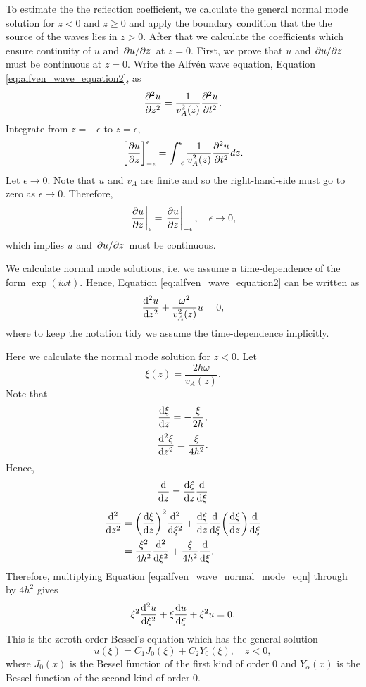 To estimate the the reflection coefficient, we calculate the general normal mode solution for $z<0$ and $z\ge0$ and apply the boundary condition that the the source of the waves lies in $z>0$. After that we calculate the coefficients which ensure continuity of $u$ and $\pdv*{u}{z}$ at $z=0$. First, we prove that $u$ and $\pdv*{u}{z}$ must be continuous at $z=0$. Write the Alfv\'en wave equation, Equation \eqref{eq:alfven_wave_equation2}, as
\[\pdv[2]{u}{z}=\frac{1}{v_A^2(z)}\pdv[2]{u}{t}.\]
Integrate from $z=-\epsilon$ to $z=\epsilon$,
\[\qty[\pdv{u}{z}]_{-\epsilon}^\epsilon=\int_{-\epsilon}^\epsilon\frac{1}{v_A^2(z)}\pdv[2]{u}{t}dz.\]
Let $\epsilon\rightarrow0$. Note that $u$ and $v_A$ are finite and so the right-hand-side must go to zero as $\epsilon\rightarrow 0$. Therefore,
\[\left.\pdv{u}{z}\right|_{\epsilon}=\left.\pdv{u}{z}\right|_{-\epsilon},\quad \epsilon\rightarrow0,\]
which implies $u$ and $\pdv*{u}{z}$ must be continuous.

We calculate normal mode solutions, i.e. we assume a time-dependence of the form $\exp(i\omega t)$. Hence, Equation \eqref{eq:alfven_wave_equation2} can be written as
\begin{equation}
    \label{eq:alfven_wave_normal_mode_eqn}
    \dv[2]{u}{z}+\frac{\omega^2}{v_A^2(z)}u=0,
\end{equation}
where to keep the notation tidy we assume the time-dependence implicitly.

Here we calculate the normal mode solution for $z<0$. Let 
\begin{equation}
    \xi(z)=\frac{2h\omega}{v_A(z)}.
\end{equation}
Note that
\[\dv{\xi}{z}=-\frac{\xi}{2h},\]
\[\dv[2]{\xi}{z}=\frac{\xi}{4h^2}.\]
Hence,
\[\dv{}{z}=\dv{\xi}{z}\dv{}{\xi}\]
\[\begin{aligned}
\dv[2]{}{z}&=\qty(\dv{\xi}{z})^2\dv[2]{}{\xi}+\dv{\xi}{z}\dv{}{\xi}\qty(\dv{\xi}{z})\dv{}{\xi} \\
&=\frac{\xi^2}{4h^2}\dv[2]{}{\xi}+\frac{\xi}{4h^2}\dv{}{\xi}.
\end{aligned}\]
Therefore, multiplying Equation \eqref{eq:alfven_wave_normal_mode_eqn} through by $4h^2$ gives
\begin{equation}
    \xi^2\dv[2]{u}{\xi}+\xi\dv{u}{\xi}+\xi^2u=0.
\end{equation}
This is the zeroth order Bessel's equation which has the general solution
\begin{equation}
    \label{eq:general_soln_z_lt_0}
    u(\xi)= C_1J_0(\xi) + C_2Y_0(\xi),\quad z<0,
\end{equation}
where $J_0(x)$ is the Bessel function of the first kind of order 0 and $Y_\alpha(x)$ is the Bessel function of the second kind of order 0. 

